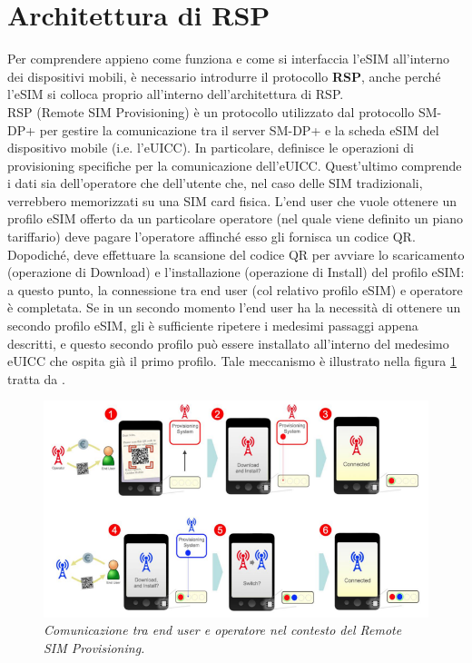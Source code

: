 \documentclass[10pt, oneside]{book}
\begin{document}
\section{Architettura di RSP}
Per comprendere appieno come funziona e come si interfaccia l'eSIM all'interno dei dispositivi mobili, è necessario introdurre il protocollo \textbf{RSP}, anche perché l'eSIM si colloca proprio all'interno dell'architettura di RSP.\\
RSP (Remote SIM Provisioning) è un protocollo utilizzato dal protocollo SM-DP+ per gestire la comunicazione tra il server SM-DP+ e la scheda eSIM del dispositivo mobile (i.e. l'eUICC). In particolare, definisce le operazioni di provisioning specifiche per la comunicazione dell'eUICC. Quest'ultimo comprende i dati sia dell'operatore che dell'utente che, nel caso delle SIM tradizionali, verrebbero memorizzati su una SIM card fisica. L'end user che vuole ottenere un profilo eSIM offerto da un particolare operatore (nel quale viene definito un piano tariffario) deve pagare l'operatore affinché esso gli fornisca un codice QR. Dopodiché, deve effettuare la scansione del codice QR per avviare lo scaricamento (operazione di Download) e l'installazione (operazione di Install) del profilo eSIM: a questo punto, la connessione tra end user (col relativo profilo eSIM) e operatore è completata. Se in un secondo momento l'end user ha la necessità di ottenere un secondo profilo eSIM, gli è sufficiente ripetere i medesimi passaggi appena descritti, e questo secondo profilo può essere installato all'interno del medesimo eUICC che ospita già il primo profilo. Tale meccanismo è illustrato nella figura \ref{fig:RSP-functioning} tratta da \cite{GSMA-whitepaper}.
\begin{figure}
\includegraphics[width=\linewidth]{RSP-functioning.png}
\caption{\textit{Comunicazione tra end user e operatore nel contesto del Remote SIM Provisioning.}}
\label{fig:RSP-functioning}
\end{figure}
\end{document}
